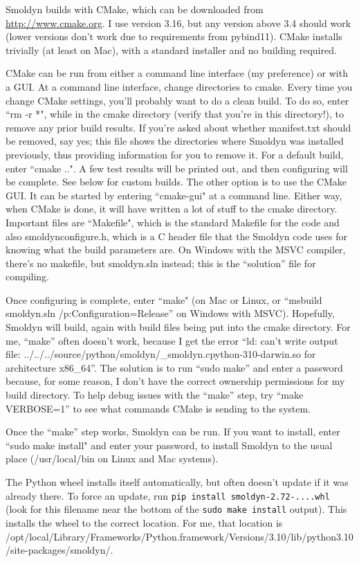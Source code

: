 \documentclass {scrbook}
\newcommand {\ttt} {\texttt}
\begin{document}
Smoldyn builds with CMake, which can be downloaded from \url{http://www.cmake.org}. I use version 3.16, but any version above 3.4 should work (lower versions don't work due to requirements from pybind11). CMake installs trivially (at least on Mac), with a standard installer and no building required.

CMake can be run from either a command line interface (my preference) or with a GUI. At a command line interface, change directories to cmake. Every time you change CMake settings, you'll probably want to do a clean build. To do so, enter ``rm -r *", while in the cmake directory (verify that you're in this directory!), to remove any prior build results. If you're asked about whether manifest.txt should be removed, say yes; this file shows the directories where Smoldyn was installed previously, thus providing information for you to remove it. For a default build, enter ``cmake ..". A few test results will be printed out, and then configuring will be complete. See below for custom builds. The other option is to use the CMake GUI. It can be started by entering ``cmake-gui" at a command line. Either way, when CMake is done, it will have written a lot of stuff to the cmake directory. Important files are ``Makefile", which is the standard Makefile for the code and also smoldynconfigure.h, which is a C header file that the Smoldyn code uses for knowing what the build parameters are. On Windows with the MSVC compiler, there's no makefile, but smoldyn.sln instead; this is the ``solution'' file for compiling.

Once configuring is complete, enter ``make" (on Mac or Linux, or ``msbuild smoldyn.sln /p:Configuration=Release'' on Windows with MSVC). Hopefully, Smoldyn will build, again with build files being put into the cmake directory. For me, ``make'' often doesn't work, because I get the error ``ld: can't write output file: ../../../source/python/smoldyn/\_smoldyn.cpython-310-darwin.so for architecture x86\_64''. The solution is to run ``sudo make'' and enter a password because, for some reason, I don't have the correct ownership permissions for my build directory. To help debug issues with the ``make'' step, try ``make VERBOSE=1'' to see what commands CMake is sending to the system.

Once the ``make'' step works, Smoldyn can be run. If you want to install, enter ``sudo make install" and enter your password, to install Smoldyn to the usual place (/usr/local/bin on Linux and Mac systems).

The Python wheel installs itself automatically, but often doesn't update if it was already there. To force an update, run \ttt{pip install smoldyn-2.72-....whl} (look for this filename near the bottom of the \ttt{sudo make install} output). This installs the wheel to the correct location. For me, that location is /opt/local/Library/Frameworks/Python.framework/Versions/3.10/lib/\allowbreak python3.10/\allowbreak site-packages/\allowbreak smoldyn/.
\end{document}
